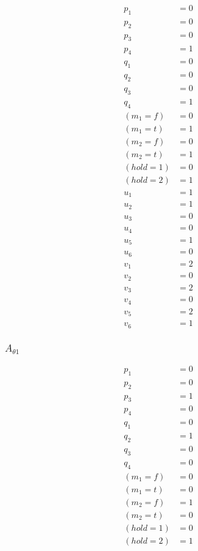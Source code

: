 \documentclass{article}
\begin{document}
\begin{align*}
  p_1 &= 0 \\
  p_2 &= 0 \\
  p_3 &= 0 \\
  p_4 &= 1 \\
  q_1 &= 0 \\
  q_2 &= 0 \\
  q_3 &= 0 \\
  q_4 &= 1 \\
  (m_1=f) &= 0 \\
  (m_1=t) &= 1 \\
  (m_2=f) &= 0 \\
  (m_2=t) &= 1 \\
  (hold=1) &= 0 \\
  (hold=2) &= 1 \\
  u_1 &= 1 \\
  u_2 &= 1 \\
  u_3 &= 0 \\
  u_4 &= 0 \\
  u_5 &= 1 \\
  u_6 &= 0 \\
  v_1 &= 2 \\
  v_2 &= 0 \\
  v_3 &= 2 \\
  v_4 &= 0 \\
  v_5 &= 2 \\
  v_6 &= 1
\end{align*}

\subsubsection{$A_{\theta 1}$}
\begin{align*}
  p_1 &= 0 \\
  p_2 &= 0 \\
  p_3 &= 1 \\
  p_4 &= 0 \\
  q_1 &= 0 \\
  q_2 &= 1 \\
  q_3 &= 0 \\
  q_4 &= 0 \\
  (m_1=f) &= 0 \\
  (m_1=t) &= 0 \\
  (m_2=f) &= 1 \\
  (m_2=t) &= 0 \\
  (hold=1) &= 0 \\
  (hold=2) &= 1
\end{align*}
\end{document}
